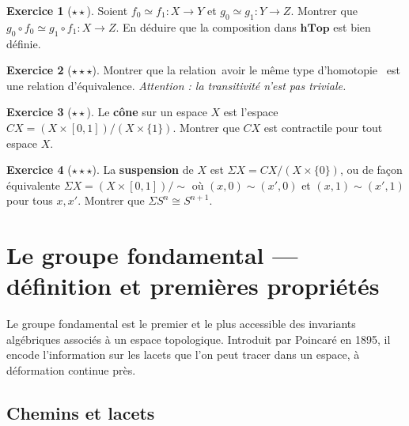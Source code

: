 \documentclass[12pt,a4paper,openany]{book}
\theoremstyle{definition}
\newtheorem{exercice}{Exercice}[chapter]
\theoremstyle{plain}
\theoremstyle{remark}
\providecommand{\og}{\guillemotleft\,}
\providecommand{\fg}{\,\guillemotright}
\begin{document}
\begin{exercice}[$\star\star$]\label{exo:homotopie-composition}
Soient $f_0 \simeq f_1 : X \to Y$ et $g_0 \simeq g_1 : Y \to Z$. Montrer que
$g_0 \circ f_0 \simeq g_1 \circ f_1 : X \to Z$. En déduire que la composition
dans $\mathbf{hTop}$ est bien définie.
\end{exercice}

\begin{exercice}[$\star\star\star$]\label{exo:equiv-homotopie-transitive}
Montrer que la relation \og avoir le même type d'homotopie \fg{} est une relation
d'équivalence. \emph{Attention : la transitivité n'est pas triviale.}
\end{exercice}

\begin{exercice}[$\star\star$]\label{exo:cone-contractile}
Le \textbf{cône} sur un espace $X$ est l'espace $CX = (X \times [0,1]) / (X \times \{1\})$.
Montrer que $CX$ est contractile pour tout espace $X$.
\end{exercice}

\begin{exercice}[$\star\star\star$]\label{exo:suspension}
La \textbf{suspension} de $X$ est $\Sigma X = CX / (X \times \{0\})$, ou de
façon équivalente $\Sigma X = (X \times [0,1]) / {\sim}$ où $(x,0) \sim (x',0)$
et $(x,1) \sim (x',1)$ pour tous $x, x'$. Montrer que $\Sigma S^n \cong S^{n+1}$.
\end{exercice}


\chapter{Le groupe fondamental --- définition et premières propriétés}\label{chap:pi1}

Le groupe fondamental est le premier et le plus accessible des invariants
algébriques associés à un espace topologique. Introduit par Poincaré en 1895, il
encode l'information sur les lacets que l'on peut tracer dans un espace, à
déformation continue près.

\section{Chemins et lacets}\label{sec:chemins}
\end{document}
